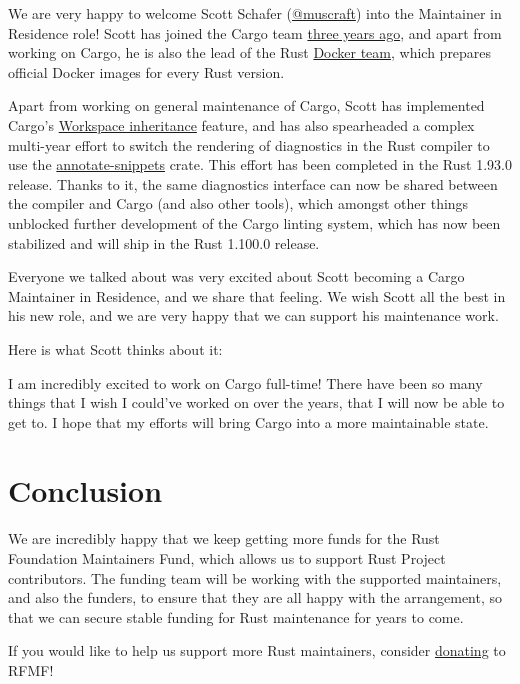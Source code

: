 \documentclass[11pt,a4paper]{article}
\begin{document}
We are very happy to welcome Scott Schafer (\href{https://github.com/Muscraft}{@muscraft}) into the Maintainer in Residence role! Scott has joined the Cargo team \href{https://blog.rust-lang.org/inside-rust/2023/04/06/cargo-new-members/}{three years ago}, and apart from working on Cargo, he is also the lead of the Rust \href{https://rust-lang.org/governance/teams/\#team-docker}{Docker team}, which prepares official Docker images for every Rust version.

Apart from working on general maintenance of Cargo, Scott has implemented Cargo's \href{https://doc.rust-lang.org/cargo/reference/workspaces.html\#the-package-table}{Workspace inheritance} feature, and has also spearheaded a complex multi-year effort to switch the rendering of diagnostics in the Rust compiler to use the \href{https://github.com/rust-lang/annotate-snippets-rs}{annotate-snippets} crate. This effort has been completed in the Rust 1.93.0 release. Thanks to it, the same diagnostics interface can now be shared between the compiler and Cargo (and also other tools), which amongst other things unblocked further development of the Cargo linting system, which has now been stabilized and will ship in the Rust 1.100.0 release.

Everyone we talked about was very excited about Scott becoming a Cargo Maintainer in Residence, and we share that feeling. We wish Scott all the best in his new role, and we are very happy that we can support his maintenance work.

Here is what Scott thinks about it:

I am incredibly excited to work on Cargo full-time! There have been so many things that I wish I could've worked on over the years, that I will now be able to get to. I hope that my efforts will bring Cargo into a more maintainable state.

\section{Conclusion}

We are incredibly happy that we keep getting more funds for the Rust Foundation Maintainers Fund, which allows us to support Rust Project contributors. The funding team will be working with the supported maintainers, and also the funders, to ensure that they are all happy with the arrangement, so that we can secure stable funding for Rust maintenance for years to come.

If you would like to help us support more Rust maintainers, consider \href{https://github.com/sponsors/rustfoundation}{donating} to RFMF!
\end{document}
